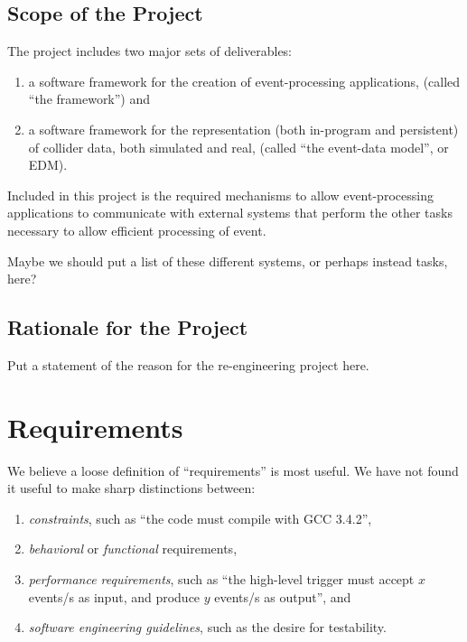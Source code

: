 \documentclass[draftmode]{memarticle}
\begin{document}
\section{Scope of the Project}

The project includes two major sets of deliverables:
\begin{enumerate}

\item

a software framework for the creation of event-processing applications,
(called ``the framework'')
and

\item

a software framework for the representation
(both in-program and persistent)
of collider data,
both simulated and real,
(called ``the event-data model'',
or EDM).

\end{enumerate}

Included in this project
is the required mechanisms
to allow event-processing applications
to communicate with external systems
that perform the other tasks necessary
to allow efficient processing of event.

\begin{fixme}
Maybe we should put a list of these different systems,
or perhaps instead tasks,
here?
\end{fixme}

\section{Rationale for the Project}

\begin{fixme}
Put a statement of the reason for the re-engineering project here.
\end{fixme}

\chapter{Requirements}\label{ch:requirements}

We believe a loose definition of ``requirements'' is most useful.
We have not found it useful to make sharp distinctions between:
\begin{enumerate}

\item
\emph{constraints}, such as ``the code must compile with GCC 3.4.2'',
\item
\emph{behavioral} or \emph{functional} requirements,
\item
\emph{performance requirements}, such as
``the high-level trigger must accept $x$ events/s as input,
and produce $y$ events/s as output'', and
\item
\emph{software engineering guidelines}, such as the desire for testability.
\end{enumerate}
\end{document}
